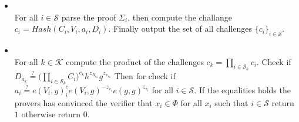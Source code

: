 \begin{algorithm}[]
\begin{itemize}
\item {}\\
For all $i\in\mathcal{S}$ parse the proof $\Sigma_i$, then compute the challange $c_i = Hash(C_i,V_i,a_i,D_i)$. Finally output the set of all challenges $\{c_i\}_{i\in\mathcal{S}}$. 

\item{} \\
For all $k\in\mathcal{K}$ compute the product of the challenges $c_k=\prod_{i\in\mathcal{S}_k} c_i$. Check if $D_{a_k}\overset{?}{=} \big( \prod_{i\in\mathcal{S}_k}C_i\big)^{c_k}h^{z_R_{a_k}}g^{z_x_{a_k}}$ 
Then for check if $ a_i \overset{?}{=} e(V_i,y)^c_i e(V_i,g)^{-z_{x_i}}e(g,g)^{z_{\tau_i}}$ for all $i\in\mathcal{S}$. If the equalities holds the provers has convinced the verifier that $x_i\in\Phi$ for all $x_i$ such that $i\in\mathcal{S}$ return $1$ otherwise return $0$.
\end{itemize}
\label{alg:ZKSM-Agg-Many}
\end{algorithm} 
